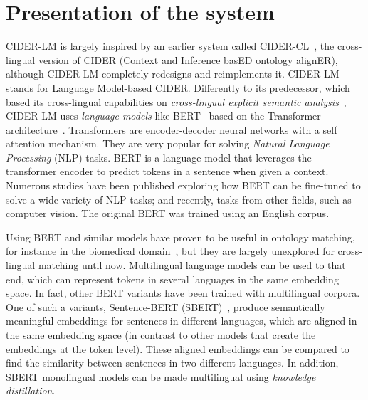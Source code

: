\documentclass[
]{ceurart}
\begin{document}
\section{Presentation of the system}

CIDER-LM is largely inspired by an earlier system called CIDER-CL~\cite{Gracia2013cidercl}, the cross-lingual version of CIDER (Context and Inference basED ontology alignER), although CIDER-LM completely redesigns and reimplements it. CIDER-LM stands for Language Model-based CIDER. Differently to its predecessor, which based its cross-lingual capabilities on \textit{cross-lingual explicit semantic analysis}~\cite{Sorg2012}, CIDER-LM uses \textit{language models} like BERT~\cite{Devlin2019} based on the Transformer architecture~\cite{Vaswani2017}. Transformers are encoder-decoder neural networks with a self attention mechanism. They are very popular for solving \textit{Natural Language Processing} (NLP) tasks. 
BERT is a language model that leverages the transformer encoder to predict tokens in a sentence when given a context. Numerous studies have been published exploring how BERT can be fine-tuned to solve a wide variety of NLP tasks; and recently, tasks from other fields, such as computer vision. The original BERT was trained using an English corpus.

Using BERT and similar models have proven to be useful in ontology matching, for instance in the biomedical domain~\cite{He2021}, but they are largely unexplored for cross-lingual matching until now. Multilingual language models can be used to that end, which can represent tokens in several languages in the same embedding space.
In fact, other BERT variants have been trained with multilingual corpora. One of such a variants, Sentence-BERT (SBERT)~\cite{Reimers2019}, produce semantically meaningful embeddings for sentences in different languages, which are aligned in the same embedding space (in contrast to other models that create the embeddings at the token level). These aligned embeddings can be compared to find the similarity between sentences in two different languages. %
In addition, SBERT monolingual models can be made multilingual using \textit{knowledge distillation}.
\end{document}
